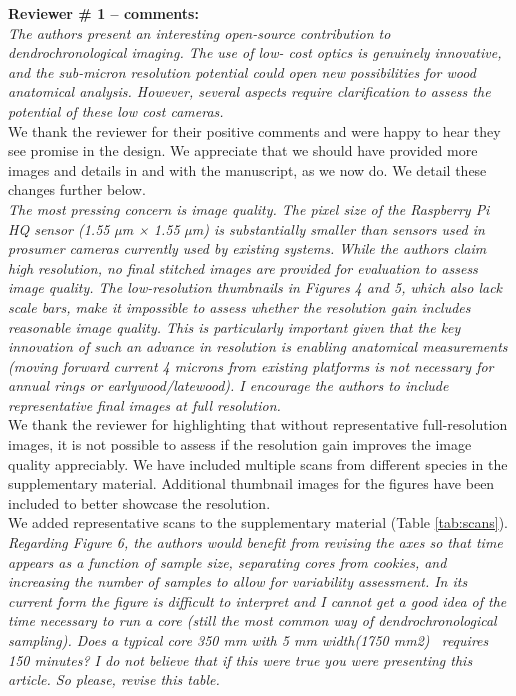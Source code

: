 \documentclass[12pt,a4paper]{article}
\begin{document}
{\bf Reviewer \# 1 -- comments:} \\

\emph{The authors present an interesting open-source contribution to dendrochronological imaging. The use of low-
cost optics is genuinely innovative, and the sub-micron resolution potential could open new possibilities
for wood anatomical analysis. However, several aspects require clarification to assess the potential of
these low cost cameras.} \\

We thank the reviewer for their positive comments and were happy to hear they see promise in the design. We appreciate that we should have provided more images and details in and with the manuscript, as we now do. We detail these changes further below.\\ 

\emph{The most pressing concern is image quality. The pixel size of the Raspberry Pi HQ sensor (1.55 µm × 1.55 µm) is substantially smaller than sensors used in prosumer cameras currently used by existing systems. While the authors claim high resolution, no final stitched images are provided for evaluation to assess image quality. The low-resolution thumbnails in Figures 4 and 5, which also lack scale bars, make it impossible to assess whether the resolution gain includes reasonable image quality. This is particularly important given that the key innovation of such an advance in resolution is enabling anatomical measurements (moving forward current 4 microns from existing platforms is not necessary for annual rings or earlywood/latewood). I encourage the authors to include representative final images at full resolution.}\\

We thank the reviewer for highlighting that without representative full-resolution images, it is not possible to assess if the resolution gain improves the image quality appreciably. We have included multiple scans from different species in the supplementary material. Additional thumbnail images for the figures have been included to better showcase the resolution. \\ 

We added representative scans to the supplementary material (Table \ref{tab:scans}). \\

\emph{Regarding Figure 6, the authors would benefit from revising the axes so that time appears as a function of sample size, separating cores from cookies, and increasing the number of samples to allow for variability assessment. In its current form the figure is difficult to interpret and I cannot get a good idea of the time necessary to run a core (still the most common way of dendrochronological sampling). Does a typical core 350 mm with 5 mm width(1750 mm2)  requires 150 minutes? I do not believe that if this were true you were presenting this article. So please, revise this table.} \\
\end{document}
